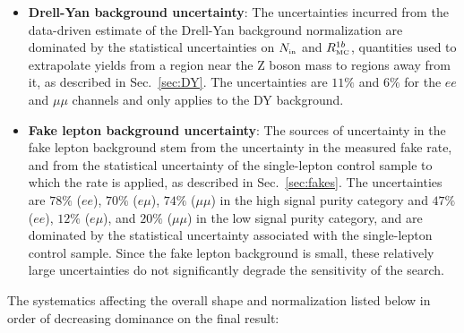 \begin{itemize}
\item \textbf{Drell-Yan background uncertainty}: The uncertainties incurred from the data-driven estimate of the Drell-Yan background normalization are dominated by the statistical uncertainties on $N_{\mbox{\tiny{in}}}$ and $R^{1b}_{\mbox{\tiny{MC}}}$, quantities used to extrapolate yields from a region near the Z boson mass to regions away from it, as described in Sec.~\ref{sec:DY}. The uncertainties are $11\%$ and $6\%$ for the $ee$ and $\mu\mu$ channels and only applies to the DY background.
\item \textbf{Fake lepton background uncertainty}:
The sources of uncertainty in the fake lepton background stem from the uncertainty in the measured fake rate, and from the statistical uncertainty of the single-lepton control sample to which the rate is applied, as described in Sec.~\ref{sec:fakes}. The uncertainties are $78\%$ ($ee$), $70\%$ ($e\mu$), $74\%$ ($\mu\mu$) in the high signal purity category and $47\%$ ($ee$), $12\%$ ($e\mu$), and $20\%$ ($\mu\mu$) in the low signal purity category, and are dominated by the statistical uncertainty associated with the single-lepton control sample. Since the fake lepton background is small, these relatively large uncertainties do not significantly degrade the sensitivity of the search.
\end{itemize}

The systematics affecting the overall \ptmiss shape and normalization listed below in order of decreasing dominance on the final result:

